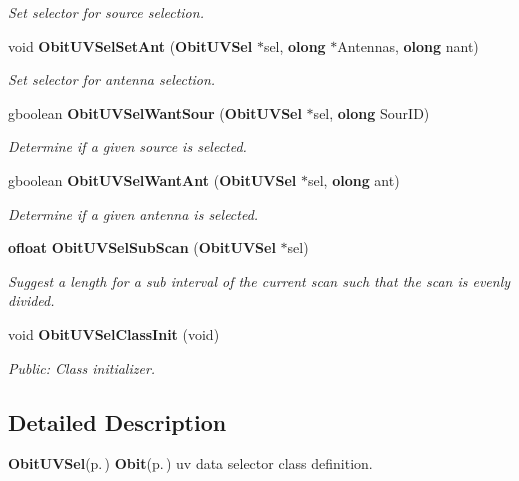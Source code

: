 \begin{CompactItemize}
\begin{CompactList}\small\item\em Set selector for source selection. \item\end{CompactList}\item 
void {\bf Obit\-UVSel\-Set\-Ant} ({\bf Obit\-UVSel} $\ast$sel, {\bf olong} $\ast$Antennas, {\bf olong} nant)
\begin{CompactList}\small\item\em Set selector for antenna selection. \item\end{CompactList}\item 
gboolean {\bf Obit\-UVSel\-Want\-Sour} ({\bf Obit\-UVSel} $\ast$sel, {\bf olong} Sour\-ID)
\begin{CompactList}\small\item\em Determine if a given source is selected. \item\end{CompactList}\item 
gboolean {\bf Obit\-UVSel\-Want\-Ant} ({\bf Obit\-UVSel} $\ast$sel, {\bf olong} ant)
\begin{CompactList}\small\item\em Determine if a given antenna is selected. \item\end{CompactList}\item 
{\bf ofloat} {\bf Obit\-UVSel\-Sub\-Scan} ({\bf Obit\-UVSel} $\ast$sel)
\begin{CompactList}\small\item\em Suggest a length for a sub interval of the current scan such that the scan is evenly divided. \item\end{CompactList}\item 
void {\bf Obit\-UVSel\-Class\-Init} (void)
\begin{CompactList}\small\item\em Public: Class initializer. \item\end{CompactList}\end{CompactItemize}


\subsection{Detailed Description}
{\bf Obit\-UVSel}{\rm (p.\,\pageref{structObitUVSel})} {\bf Obit}{\rm (p.\,\pageref{structObit})} uv data selector class definition. 

